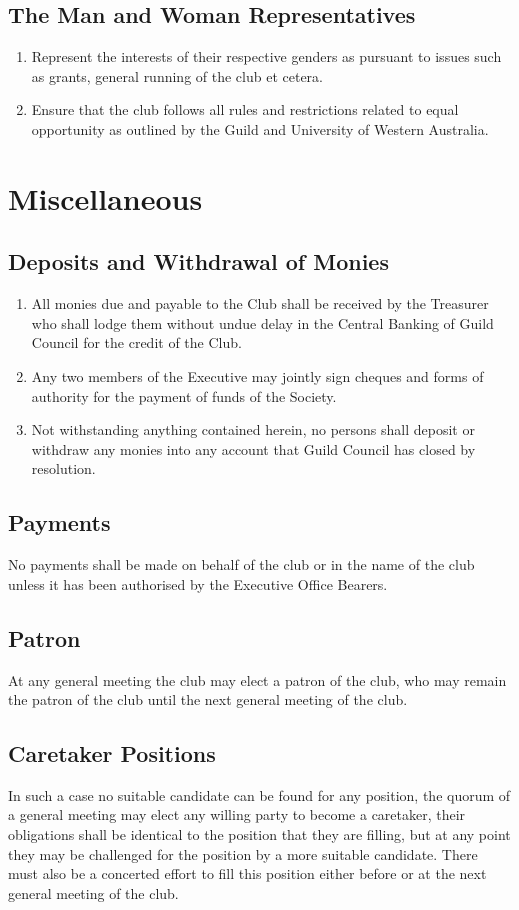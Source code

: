 \documentclass[10pt,a4paper]{report}
\begin{document}
		\section{The Man and Woman Representatives}
			\begin{enumerate}[label=\alph*]
				\item Represent the interests of their respective genders as pursuant to issues such as grants, general running of the club et cetera.
				\item Ensure that the club follows all rules and restrictions related to equal opportunity as outlined by the Guild and University of Western Australia.
			\end{enumerate}

	\chapter{Miscellaneous}
		\section{Deposits and Withdrawal of Monies}
			\begin{enumerate}[label=\arabic*]
				\item All monies due and payable to the Club shall be received by the Treasurer who shall lodge them without undue delay in the Central Banking of Guild Council for the credit of the Club.
				\item Any two members of the Executive may jointly sign cheques and forms of authority for the payment of funds of the Society.
				\item Not withstanding anything contained herein, no persons shall deposit or withdraw any monies into any account that Guild Council has closed by resolution.
			\end{enumerate}
		\section{Payments}
			No payments shall be made on behalf of the club or in the name of the club unless it has been authorised by the Executive Office Bearers.
		\section{Patron}
			At any general meeting the club may elect a patron of the club, who may remain the patron of the club until the next general meeting of the club. \\
		\section{Caretaker Positions}
		In such a case no suitable candidate can be found for any position, the quorum of a general meeting may elect any willing party to become a caretaker, their obligations shall be identical to the position that they are filling, but at any point they may be challenged for the position by a more suitable candidate. There must also be a concerted effort to fill this position either before or at the next general meeting of the club.
\end{document}
